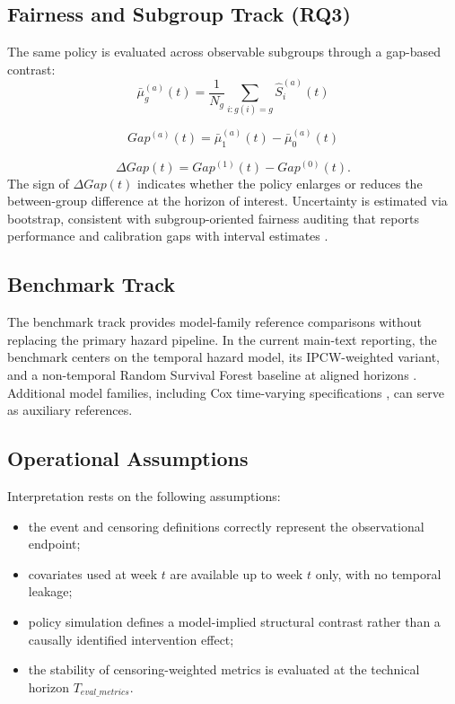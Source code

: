 \subsection{Fairness and Subgroup Track (RQ3)}

The same policy is evaluated across observable subgroups through a gap-based contrast:
\begin{equation*}
\bar\mu_g^{(a)}(t)=\frac{1}{N_g}\sum_{i:g(i)=g}\hat S_i^{(a)}(t)
\end{equation*}

\begin{equation*}
Gap^{(a)}(t)=\bar\mu_1^{(a)}(t)-\bar\mu_0^{(a)}(t)
\end{equation*}

\begin{equation}
\label{eq:delta_gap}
\Delta Gap(t)=Gap^{(1)}(t)-Gap^{(0)}(t).
\end{equation}
The sign of $\Delta Gap(t)$ indicates whether the policy enlarges or reduces the between-group difference at the horizon of interest. Uncertainty is estimated via bootstrap, consistent with subgroup-oriented fairness auditing that reports performance and calibration gaps with interval estimates \cite{PessachShmueli2022FairnessReview,Lu2022ReliabilityFairnessAudit,Opoku2025AccuracyFairness}.

\subsection{Benchmark Track}

The benchmark track provides model-family reference comparisons without replacing the primary hazard pipeline. In the current main-text reporting, the benchmark centers on the temporal hazard model, its IPCW-weighted variant, and a non-temporal Random Survival Forest baseline at aligned horizons \cite{MogensenIshwaranGerds2012RSF}. Additional model families, including Cox time-varying specifications \cite{Cox1972RegressionModels}, can serve as auxiliary references.

\subsection{Operational Assumptions}

Interpretation rests on the following assumptions:
\begin{itemize}
\item the event and censoring definitions correctly represent the observational endpoint;
\item covariates used at week $t$ are available up to week $t$ only, with no temporal leakage;
\item policy simulation defines a model-implied structural contrast rather than a causally identified intervention effect;
\item the stability of censoring-weighted metrics is evaluated at the technical horizon $T_{eval\_metrics}$.
\end{itemize}

